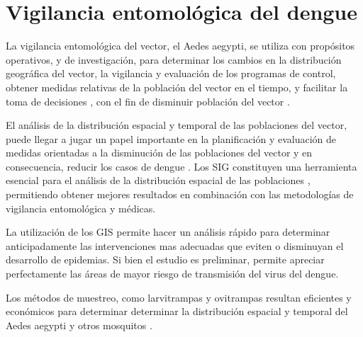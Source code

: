 \section{Vigilancia entomológica del dengue}
\label{sec:gis-vigilancia-entomologica-dengue}
La vigilancia entomológica del vector, el Aedes aegypti, se utiliza con propósitos operativos, y de
investigación, para determinar los cambios en la distribución geográfica del vector, la vigilancia
y evaluación de los programas de control, obtener medidas relativas de la población del vector en
el tiempo, y facilitar la toma de decisiones \cite{world2009dengue}, con el fin de disminuir
población del vector \cite{world2009dengue,dengueUruguayCap1, cenaprece2013,NINO2011}.

El análisis de la distribución espacial y temporal de las poblaciones del vector, puede llegar a
jugar un papel importante en la planificación y evaluación de medidas orientadas a la disminución
de las poblaciones del vector y en consecuencia, reducir los casos de dengue
\cite{world2009dengue,dengueUruguayCap1, cenaprece2013,nino2008uso}. Los SIG constituyen una
herramienta esencial para el análisis de la distribución espacial de las poblaciones
\cite{vgomesAegis2001,petric2012surveillance}, permitiendo obtener mejores resultados en
combinación con las metodologías de vigilancia entomológica y médicas\cite{petric2012surveillance}.

La utilización de los GIS permite hacer un análisis rápido para determinar anticipadamente las
intervenciones mas adecuadas que eviten o disminuyan el desarrollo de
epidemias\cite{bottinelli2002estratificacion}. Si bien el estudio es preliminar, permite
apreciar perfectamente las áreas de mayor riesgo de transmisión del virus del dengue\cite{bottinelli2002estratificacion, NINO2011}.

Los métodos de muestreo, como larvitrampas y ovitrampas resultan eficientes y económicos para
determinar determinar la distribución espacial y temporal del Aedes aegypti y otros mosquitos
\cite{dengueUruguayCap1, cenaprece2013}.



